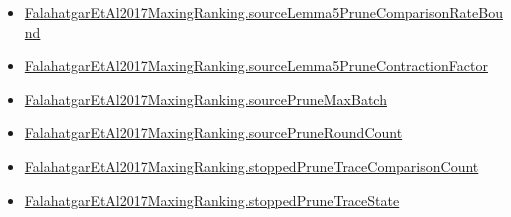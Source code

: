 \documentclass[10pt]{article}
\begin{document}
\begin{itemize}
\item \hyperlink{governing-declaration-dac2c682a1bccd41}{Falahatgar\allowbreak{}Et\allowbreak{}Al2017\allowbreak{}Maxing\allowbreak{}Ranking.\allowbreak{}source\allowbreak{}Lemma5\allowbreak{}Prune\allowbreak{}Comparison\allowbreak{}Rate\allowbreak{}Bound}
\item \hyperlink{governing-declaration-c4909909facd85e5}{Falahatgar\allowbreak{}Et\allowbreak{}Al2017\allowbreak{}Maxing\allowbreak{}Ranking.\allowbreak{}source\allowbreak{}Lemma5\allowbreak{}Prune\allowbreak{}Contraction\allowbreak{}Factor}
\item \hyperlink{governing-declaration-753e8447dfb04151}{Falahatgar\allowbreak{}Et\allowbreak{}Al2017\allowbreak{}Maxing\allowbreak{}Ranking.\allowbreak{}source\allowbreak{}Prune\allowbreak{}Max\allowbreak{}Batch}
\item \hyperlink{governing-declaration-7a4a97da03826b66}{Falahatgar\allowbreak{}Et\allowbreak{}Al2017\allowbreak{}Maxing\allowbreak{}Ranking.\allowbreak{}source\allowbreak{}Prune\allowbreak{}Round\allowbreak{}Count}
\item \hyperlink{governing-declaration-35a38588d49521f4}{Falahatgar\allowbreak{}Et\allowbreak{}Al2017\allowbreak{}Maxing\allowbreak{}Ranking.\allowbreak{}stopped\allowbreak{}Prune\allowbreak{}Trace\allowbreak{}Comparison\allowbreak{}Count}
\item \hyperlink{governing-declaration-bb5991f407529737}{Falahatgar\allowbreak{}Et\allowbreak{}Al2017\allowbreak{}Maxing\allowbreak{}Ranking.\allowbreak{}stopped\allowbreak{}Prune\allowbreak{}Trace\allowbreak{}State}
\end{itemize}
\end{document}
